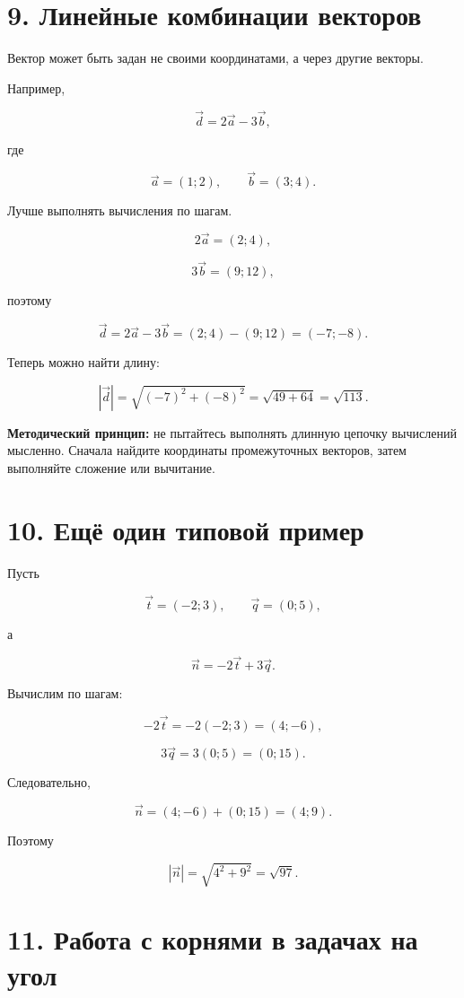 \documentclass[a4paper,12pt]{article}
\begin{document}
\section*{\color{darkaccent}9. Линейные комбинации векторов}

Вектор может быть задан не своими координатами, а через другие векторы.

Например,

\[
\vec d=2\vec a-3\vec b,
\]

где

\[
\vec a=(1;2),
\qquad
\vec b=(3;4).
\]

Лучше выполнять вычисления по шагам.

\[
2\vec a=(2;4),
\]

\[
3\vec b=(9;12),
\]

поэтому

\[
\vec d
=
2\vec a-3\vec b
=
(2;4)-(9;12)
=
(-7;-8).
\]

Теперь можно найти длину:

\[
|\vec d|
=
\sqrt{(-7)^2+(-8)^2}
=
\sqrt{49+64}
=
\sqrt{113}.
\]

\textbf{Методический принцип:}
не пытайтесь выполнять длинную цепочку вычислений мысленно.
Сначала найдите координаты промежуточных векторов, затем выполняйте сложение или вычитание.


\section*{\color{darkaccent}10. Ещё один типовой пример}

Пусть

\[
\vec t=(-2;3),
\qquad
\vec q=(0;5),
\]

а

\[
\vec n=-2\vec t+3\vec q.
\]

Вычислим по шагам:

\[
-2\vec t
=
-2(-2;3)
=
(4;-6),
\]

\[
3\vec q
=
3(0;5)
=
(0;15).
\]

Следовательно,

\[
\vec n
=
(4;-6)+(0;15)
=
(4;9).
\]

Поэтому

\[
|\vec n|
=
\sqrt{4^2+9^2}
=
\sqrt{97}.
\]


\section*{\color{darkaccent}11. Работа с корнями в задачах на угол}
\end{document}
